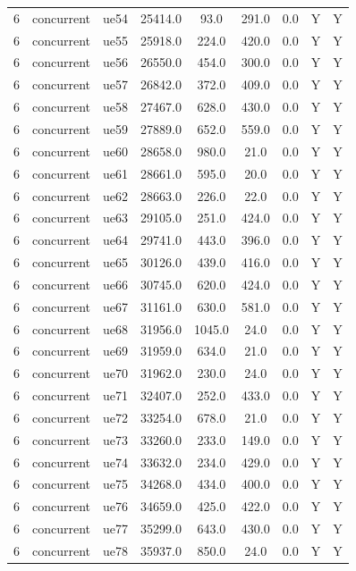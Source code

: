 \begin{table}[ht]
\begin{tabular}{|c|c|c|c|c|c|c|c|c|}
6 & concurrent & ue54 & 25414.0 & 93.0 & 291.0 & 0.0 & Y & Y \\
6 & concurrent & ue55 & 25918.0 & 224.0 & 420.0 & 0.0 & Y & Y \\
6 & concurrent & ue56 & 26550.0 & 454.0 & 300.0 & 0.0 & Y & Y \\
6 & concurrent & ue57 & 26842.0 & 372.0 & 409.0 & 0.0 & Y & Y \\
6 & concurrent & ue58 & 27467.0 & 628.0 & 430.0 & 0.0 & Y & Y \\
6 & concurrent & ue59 & 27889.0 & 652.0 & 559.0 & 0.0 & Y & Y \\
6 & concurrent & ue60 & 28658.0 & 980.0 & 21.0 & 0.0 & Y & Y \\
6 & concurrent & ue61 & 28661.0 & 595.0 & 20.0 & 0.0 & Y & Y \\
6 & concurrent & ue62 & 28663.0 & 226.0 & 22.0 & 0.0 & Y & Y \\
6 & concurrent & ue63 & 29105.0 & 251.0 & 424.0 & 0.0 & Y & Y \\
6 & concurrent & ue64 & 29741.0 & 443.0 & 396.0 & 0.0 & Y & Y \\
6 & concurrent & ue65 & 30126.0 & 439.0 & 416.0 & 0.0 & Y & Y \\
6 & concurrent & ue66 & 30745.0 & 620.0 & 424.0 & 0.0 & Y & Y \\
6 & concurrent & ue67 & 31161.0 & 630.0 & 581.0 & 0.0 & Y & Y \\
6 & concurrent & ue68 & 31956.0 & 1045.0 & 24.0 & 0.0 & Y & Y \\
6 & concurrent & ue69 & 31959.0 & 634.0 & 21.0 & 0.0 & Y & Y \\
6 & concurrent & ue70 & 31962.0 & 230.0 & 24.0 & 0.0 & Y & Y \\
6 & concurrent & ue71 & 32407.0 & 252.0 & 433.0 & 0.0 & Y & Y \\
6 & concurrent & ue72 & 33254.0 & 678.0 & 21.0 & 0.0 & Y & Y \\
6 & concurrent & ue73 & 33260.0 & 233.0 & 149.0 & 0.0 & Y & Y \\
6 & concurrent & ue74 & 33632.0 & 234.0 & 429.0 & 0.0 & Y & Y \\
6 & concurrent & ue75 & 34268.0 & 434.0 & 400.0 & 0.0 & Y & Y \\
6 & concurrent & ue76 & 34659.0 & 425.0 & 422.0 & 0.0 & Y & Y \\
6 & concurrent & ue77 & 35299.0 & 643.0 & 430.0 & 0.0 & Y & Y \\
6 & concurrent & ue78 & 35937.0 & 850.0 & 24.0 & 0.0 & Y & Y \\

\end{tabular}
\end{table}
